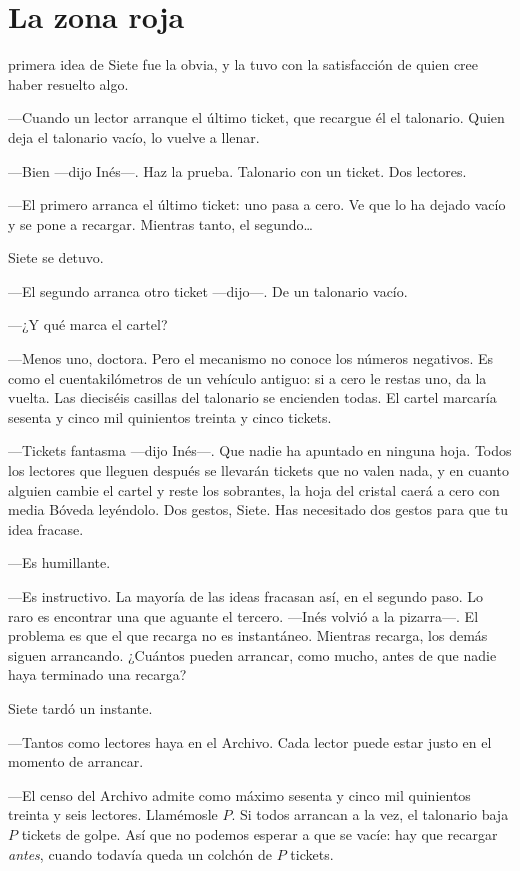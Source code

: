 \chapter{La zona roja}

 primera idea de Siete fue la obvia, y la tuvo con la satisfacción de quien cree haber resuelto algo.

---Cuando un lector arranque el último ticket, que recargue él el talonario. Quien deja el talonario vacío, lo vuelve a llenar.

---Bien ---dijo Inés---\nobreak. Haz la prueba. Talonario con un ticket. Dos lectores.

---El primero arranca el último ticket: uno pasa a cero. Ve que lo ha dejado vacío y se pone a recargar. Mientras tanto, el segundo\ldots

Siete se detuvo.

---El segundo arranca otro ticket ---dijo---\nobreak. De un talonario vacío.

---¿Y qué marca el cartel?

---Menos uno, doctora. Pero el mecanismo no conoce los números negativos. Es como el cuentakilómetros de un vehículo antiguo: si a cero le restas uno, da la vuelta. Las dieciséis casillas del talonario se encienden todas. El cartel marcaría sesenta y cinco mil quinientos treinta y cinco tickets.

---Tickets fantasma ---dijo Inés---\nobreak. Que nadie ha apuntado en ninguna hoja. Todos los lectores que lleguen después se llevarán tickets que no valen nada, y en cuanto alguien cambie el cartel y reste los sobrantes, la hoja del cristal caerá a cero con media Bóveda leyéndolo. Dos gestos, Siete. Has necesitado dos gestos para que tu idea fracase.

---Es humillante.

---Es instructivo. La mayoría de las ideas fracasan así, en el segundo paso. Lo raro es encontrar una que aguante el tercero. ---Inés volvió a la pizarra---\nobreak. El problema es que el que recarga no es instantáneo. Mientras recarga, los demás siguen arrancando. ¿Cuántos pueden arrancar, como mucho, antes de que nadie haya terminado una recarga?

Siete tardó un instante.

---Tantos como lectores haya en el Archivo. Cada lector puede estar justo en el momento de arrancar.

---El censo del Archivo admite como máximo sesenta y cinco mil quinientos treinta y seis lectores. Llamémosle $P$. Si todos arrancan a la vez, el talonario baja $P$ tickets de golpe. Así que no podemos esperar a que se vacíe: hay que recargar \emph{antes}, cuando todavía queda un colchón de $P$ tickets.

